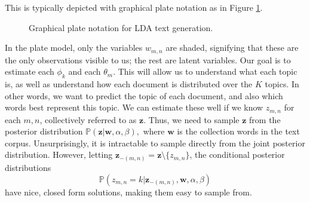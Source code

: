 This is typically depicted with graphical plate notation as in Figure \ref{fig:ldaplates}.
\begin{figure}[h]
\centering
{}
\caption{Graphical plate notation for LDA text generation.}
\label{fig:ldaplates}
\end{figure}

In the plate model, only the variables $w_{m,n}$ are shaded, signifying that these are the only observations visible to us; the rest are latent variables. Our goal is to estimate each $\phi_{k}$ and each $\theta_{m}$. This will allow us to understand what each topic is, as well as understand how each document is distributed over the $K$ topics. In other words, we want to predict the topic of each document, and also which words best represent this topic.
We can estimate these well if we know $z_{m,n}$ for each $m, n$, collectively referred to as $\mathbf{z}$. Thus, we need to sample
$\mathbf{z}$ from the posterior distribution $\mathbb{P}(\mathbf{z} | \mathbf{w}, \alpha, \beta),$ where $\mathbf{w}$ is the collection words in the text corpus. Unsurprisingly, it is intractable to sample directly from the joint posterior distribution. However, letting $\mathbf{z}_{-(m,n)} = \mathbf{z}\setminus \{z_{m,n}\}$, the conditional posterior distributions
\[\mathbb{P}(z_{m,n} = k | \mathbf{z}_{-(m,n)}, \mathbf{w}, \alpha, \beta)\]
have nice, closed form solutions, making them easy to sample from.

